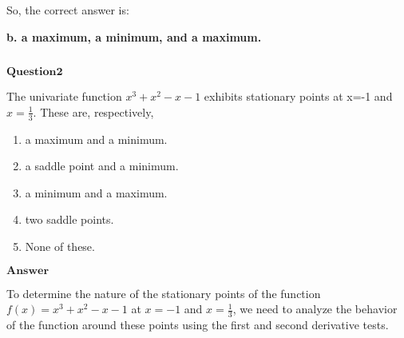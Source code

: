 \documentclass[11pt]{article}
\makeatletter
\newcommand{\boxspacing}{\kern\kvtcb@left@rule\kern\kvtcb@boxsep}
\newcommand{\prompt}[4]{
        {\ttfamily\llap{{\color{#2}[#3]:\hspace{3pt}#4}}\vspace{-\baselineskip}}
    }
\makeatother
\begin{document}
So, the correct answer is:

\textbf{b. a maximum, a minimum, and a maximum.}

    \begin{tcolorbox}[breakable, size=fbox, boxrule=1pt, pad at break*=1mm,colback=cellbackground, colframe=cellborder]
\prompt{In}{incolor}{ }{\boxspacing}
\begin{Verbatim}[commandchars=\\\{\}]

\end{Verbatim}
\end{tcolorbox}

    $\textbf{Question2}$

The univariate function $x^3 + x^2 -x -1$ exhibits stationary points
at x=-1 and $x=\frac{1}{3}$. These are, respectively,

\begin{enumerate}
\def\labelenumi{\alph{enumi}.}
\item
  a maximum and a minimum.
\item
  a saddle point and a minimum.
\item
  a minimum and a maximum.
\item
  two saddle points.
\item
  None of these.
\end{enumerate}

$\textbf{Answer}$

    To determine the nature of the stationary points of the function 
$ f(x)= x^3 + x^2 - x - 1 $ at $ x = -1 $ and $ x = \frac{1}{3} $,
we need to analyze the behavior of the function around these points
using the first and second derivative tests.
\end{document}
